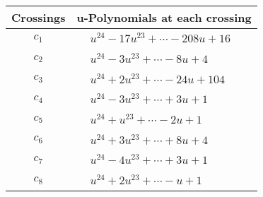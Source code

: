 \documentclass[1p]{elsarticle_modified}
\theoremstyle{definition}
\begin{document}
\begin{tabular}{m{50pt}|m{274pt}}
Crossings & \hspace{64pt}u-Polynomials at each crossing \\
\hline $$\begin{aligned}c_{1}\end{aligned}$$&$\begin{aligned}
&u^{24}-17 u^{23}+\cdots-208 u+16
\end{aligned}$\\
\hline $$\begin{aligned}c_{2}\end{aligned}$$&$\begin{aligned}
&u^{24}-3 u^{23}+\cdots-8 u+4
\end{aligned}$\\
\hline $$\begin{aligned}c_{3}\end{aligned}$$&$\begin{aligned}
&u^{24}+2 u^{23}+\cdots-24 u+104
\end{aligned}$\\
\hline $$\begin{aligned}c_{4}\end{aligned}$$&$\begin{aligned}
&u^{24}-3 u^{23}+\cdots+3 u+1
\end{aligned}$\\
\hline $$\begin{aligned}c_{5}\end{aligned}$$&$\begin{aligned}
&u^{24}+u^{23}+\cdots-2 u+1
\end{aligned}$\\
\hline $$\begin{aligned}c_{6}\end{aligned}$$&$\begin{aligned}
&u^{24}+3 u^{23}+\cdots+8 u+4
\end{aligned}$\\
\hline $$\begin{aligned}c_{7}\end{aligned}$$&$\begin{aligned}
&u^{24}-4 u^{23}+\cdots+3 u+1
\end{aligned}$\\
\hline $$\begin{aligned}c_{8}\end{aligned}$$&$\begin{aligned}
&u^{24}+2 u^{23}+\cdots- u+1
\end{aligned}$\\

\end{tabular}
\end{document}

